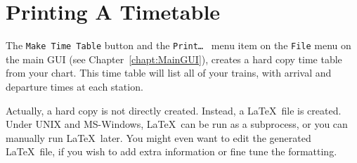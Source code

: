 
\chapter{Printing A Timetable}
\label{chapt:PrintingATimetable}

The {\tt Make Time Table} button and the {\tt Print\ldots\ } menu item
on the {\tt File} menu on the main GUI (see
Chapter~\ref{chapt:MainGUI}), creates a hard copy time table from your
chart.  This time table will list all of your trains, with arrival and
departure times at each station.

Actually, a hard copy is not directly created.  Instead, a \LaTeX\ file
is created.  Under UNIX and MS-Windows, \LaTeX\ can be run as a
subprocess, or you can manually run \LaTeX\ later.  You might even want
to edit the generated \LaTeX\ file, if you wish to add extra
information or fine tune the formatting.

